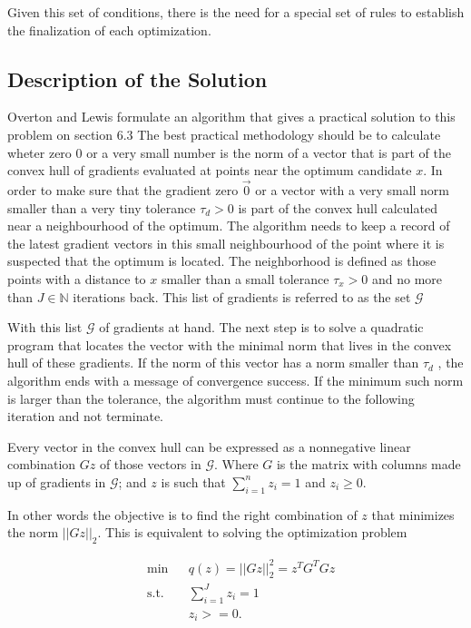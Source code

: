 Given this set of conditions, there is the need for a special set of rules to establish the finalization of each optimization.

\subsection{Description of the Solution}

Overton and Lewis formulate an algorithm that gives a practical solution to this problem on section $6.3$ \citep{overtonlewis}
The best practical methodology should be to calculate wheter zero $0$ or a very small number is the norm of a vector that is part of the convex hull of gradients evaluated at points near the optimum candidate $x$. In order to make sure that the gradient zero $\vec{0}$ or a vector with a very small norm smaller than a very tiny tolerance $\tau_d > 0$ is part of the convex hull calculated near a neighbourhood of the optimum. The algorithm needs to keep a record of the latest gradient vectors in this small neighbourhood of the point where it is suspected that the optimum is located. The neighborhood is defined as those points with a distance to $x$ smaller than a small tolerance $\tau_x > 0$ and no more than $J \in \mathbb{N}$ iterations back.  This list of gradients is referred to as the set $\mathcal{G}$ \citep{overtonlewis}

With this list $\mathcal{G}$ of gradients at hand. The next step is to solve a quadratic program that locates the vector with the minimal norm that lives in the convex hull of these gradients.  If the norm of this vector has a norm smaller than $\tau_d$ , the algorithm ends with a message of convergence success. If the minimum such norm is larger than the tolerance, the algorithm must continue to the following iteration and not terminate.

Every vector in the convex hull can be expressed as a nonnegative linear combination $Gz$ of those vectors in $\mathcal{G}$. Where $G$ is the matrix with columns made up of gradients in $\mathcal{G}$; and $z$ is such that $\sum_{i=1}^n z_i = 1$ and $z_i \geq 0$.

In other words the objective is to find the right combination of $z$ that minimizes the norm $||Gz||_2$.  This is equivalent to solving the optimization problem

\begin{equation} \label{quadraticproblem}
  \begin{aligned}
    & {\text{min}}
    & & q(z) = ||G z ||_2^2 = z^TG^TGz  \\
    & \text{s.t.}
    & & \sum_{i = 1} ^J z_i = 1 \; \\
    & & & z_i >= 0.
  \end{aligned}
\end{equation}

